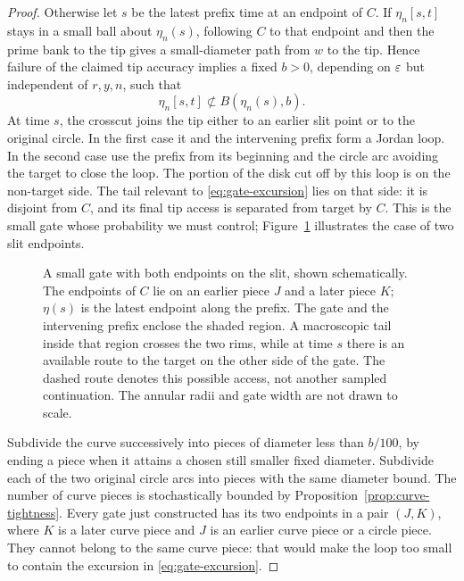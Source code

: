 \begin{proof}
Otherwise let $s$ be the latest prefix time at an endpoint of $C$.
If $\eta_n[s,t]$ stays in a small ball about $\eta_n(s)$, following
$C$ to that endpoint and then the prime bank to the tip gives a
small-diameter path from $w$ to the tip.  Hence failure of the
claimed tip accuracy implies a fixed $b>0$, depending on $\varepsilon$
but independent of $r,y,n$, such that
\begin{equation}\label{eq:gate-excursion}
 \eta_n[s,t]\not\subset B(\eta_n(s),b).
\end{equation}
At time $s$, the crosscut joins the tip either to an earlier slit
point or to the original circle.  In the first case it and the
intervening prefix form a Jordan loop.  In the second case use the
prefix from its beginning and the circle arc avoiding the target
to close the loop.  The portion of the disk cut off by this loop
is on the non-target side.  The tail relevant to
\eqref{eq:gate-excursion} lies on that side: it is disjoint from
$C$, and its final tip access is separated from target by $C$.
This is the small gate whose probability we must control;
Figure~\ref{fig:tip-gate} illustrates the case of two slit endpoints.

\begin{figure}[tb]
 \centering
 
 \caption{A small gate with both endpoints on the slit, shown
 schematically.  The endpoints of $C$ lie on an earlier piece $J$
 and a later piece $K$; $\eta(s)$ is the latest endpoint along the
 prefix.  The gate and the intervening prefix enclose the shaded
 region.  A macroscopic tail inside that region crosses the two
 rims, while at time $s$ there is an available route to the target
 on the other side of the gate.  The dashed route denotes this
 possible access, not another sampled continuation.  The annular
 radii and gate width are not drawn to scale.}
 \label{fig:tip-gate}
\end{figure}

Subdivide the curve successively into pieces of diameter less than
$b/100$, by ending a piece when it attains a chosen still smaller
fixed diameter.  Subdivide each of the two original circle arcs
into pieces with the same diameter bound.  The number of curve
pieces is stochastically bounded by
Proposition~\ref{prop:curve-tightness}.  Every gate just constructed
has its two endpoints in a pair $(J,K)$, where $K$ is a later
curve piece and $J$ is an earlier curve piece or a circle piece.
They cannot belong to the same curve piece: that would make the
loop too small to contain the excursion in
\eqref{eq:gate-excursion}.


\end{proof}
